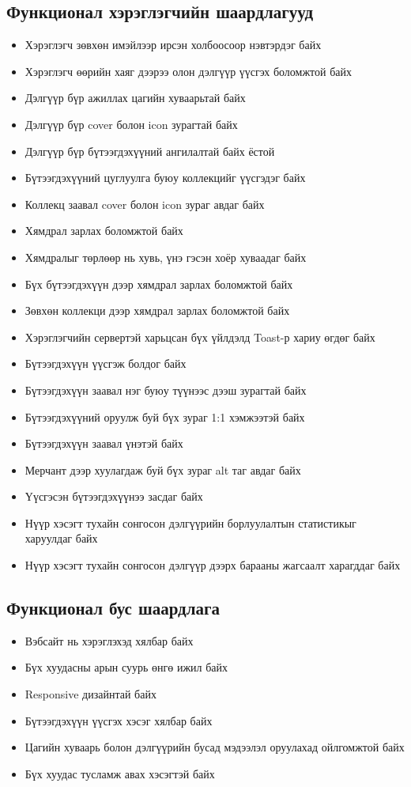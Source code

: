	\subsection{Функционал хэрэглэгчийн шаардлагууд}
     \begin{itemize}
        \item Хэрэглэгч зөвхөн имэйлээр ирсэн холбоосоор нэвтэрдэг байх
        \item Хэрэглэгч өөрийн хаяг дээрээ олон дэлгүүр үүсгэх боломжтой байх
        \item Дэлгүүр бүр ажиллах цагийн хуваарьтай байх
        \item Дэлгүүр бүр cover болон icon зурагтай байх
        \item Дэлгүүр бүр бүтээгдэхүүний ангилалтай байх ёстой
        \item Бүтээгдэхүүний цуглуулга буюу коллекцийг үүсгэдэг байх
        \item Коллекц заавал cover болон icon зураг авдаг байх
        \item Хямдрал зарлах боломжтой байх
        \item Хямдралыг төрлөөр нь хувь, үнэ гэсэн хоёр хуваадаг байх
        \item Бүх бүтээгдэхүүн дээр хямдрал зарлах боломжтой байх
        \item Зөвхөн коллекци дээр хямдрал зарлах боломжтой байх
        \item Хэрэглэгчийн сервертэй харьцсан бүх үйлдэлд Toast-р хариу өгдөг байх
        \item Бүтээгдэхүүн үүсгэж болдог байх
        \item Бүтээгдэхүүн заавал нэг буюу түүнээс дээш зурагтай байх
        \item Бүтээгдэхүүний оруулж буй бүх зураг 1:1 хэмжээтэй байх
        \item Бүтээгдэхүүн заавал үнэтэй байх
        \item Мерчант дээр хуулагдаж буй бүх зураг alt таг авдаг байх
        \item Үүсгэсэн бүтээгдэхүүнээ засдаг байх
        \item Нүүр хэсэгт тухайн сонгосон дэлгүүрийн борлуулалтын статистикыг харуулдаг байх
        \item Нүүр хэсэгт тухайн сонгосон дэлгүүр дээрх барааны жагсаалт харагддаг байх
    \end{itemize}
  \subsection{Функционал бус шаардлага}
    \begin{itemize}
        \item Вэбсайт нь хэрэглэхэд хялбар байх
        \item Бүх хуудасны арын суурь өнгө ижил байх
        \item Responsive дизайнтай байх
        \item Бүтээгдэхүүн үүсгэх хэсэг хялбар байх
        \item Цагийн хуваарь болон дэлгүүрийн бусад мэдээлэл оруулахад ойлгомжтой байх
        \item Бүх хуудас тусламж авах хэсэгтэй байх
    \end{itemize}
\pagebreak
